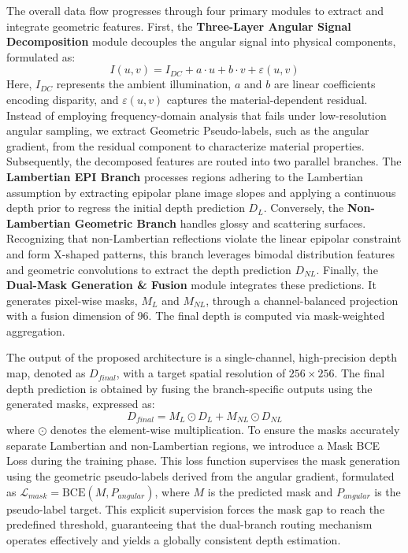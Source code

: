 \documentclass[lettersize,journal]{IEEEtran}
\begin{document}
The overall data flow progresses through four primary modules to extract and integrate geometric features. First, the \textbf{Three-Layer Angular Signal Decomposition} module decouples the angular signal into physical components, formulated as:
\begin{equation}
\label{eq:eq1}
I(u,v) = I_{DC} + a \cdot u + b \cdot v + \varepsilon(u,v)
\end{equation}
Here, $I_{DC}$ represents the ambient illumination, $a$ and $b$ are linear coefficients encoding disparity, and $\varepsilon(u,v)$ captures the material-dependent residual. Instead of employing frequency-domain analysis that fails under low-resolution angular sampling, we extract Geometric Pseudo-labels, such as the angular gradient, from the residual component to characterize material properties. Subsequently, the decomposed features are routed into two parallel branches. The \textbf{Lambertian EPI Branch} processes regions adhering to the Lambertian assumption by extracting epipolar plane image slopes and applying a continuous depth prior to regress the initial depth prediction $D_L$. Conversely, the \textbf{Non-Lambertian Geometric Branch} handles glossy and scattering surfaces. Recognizing that non-Lambertian reflections violate the linear epipolar constraint and form X-shaped patterns, this branch leverages bimodal distribution features and geometric convolutions to extract the depth prediction $D_{NL}$. Finally, the \textbf{Dual-Mask Generation & Fusion} module integrates these predictions. It generates pixel-wise masks, $M_L$ and $M_{NL}$, through a channel-balanced projection with a fusion dimension of 96. The final depth is computed via mask-weighted aggregation.

The output of the proposed architecture is a single-channel, high-precision depth map, denoted as $D_{final}$, with a target spatial resolution of $256 \times 256$. The final depth prediction is obtained by fusing the branch-specific outputs using the generated masks, expressed as:
\begin{equation}
\label{eq:eq2}
D_{final} = M_L \odot D_L + M_{NL} \odot D_{NL}
\end{equation}
where $\odot$ denotes the element-wise multiplication. To ensure the masks accurately separate Lambertian and non-Lambertian regions, we introduce a Mask BCE Loss during the training phase. This loss function supervises the mask generation using the geometric pseudo-labels derived from the angular gradient, formulated as $\mathcal{L}_{mask} = \text{BCE}(M, P_{angular})$, where $M$ is the predicted mask and $P_{angular}$ is the pseudo-label target. This explicit supervision forces the mask gap to reach the predefined threshold, guaranteeing that the dual-branch routing mechanism operates effectively and yields a globally consistent depth estimation.
\end{document}
